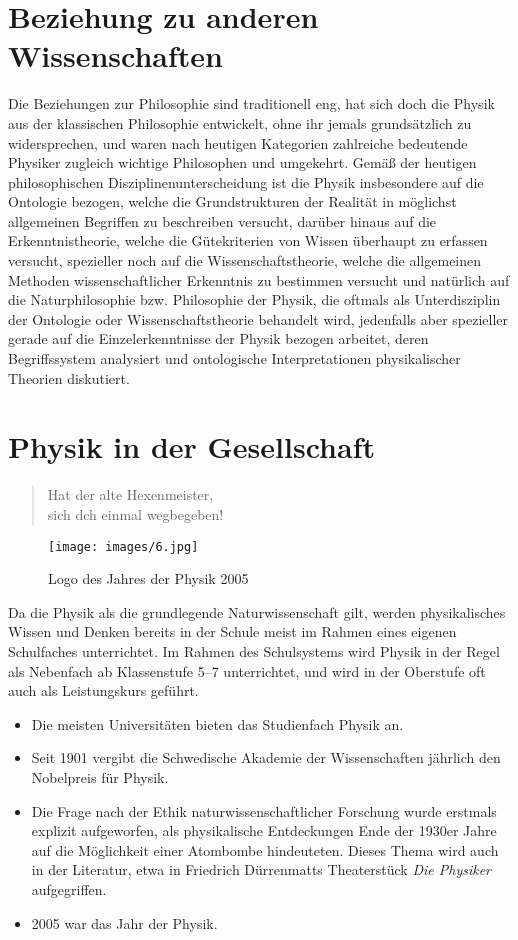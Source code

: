 \documentclass[titlepage, parkskip=full, twocolumn, landscape]{scrartcl}
\begin{document}
\section{Beziehung zu anderen Wissenschaften}

Die Beziehungen zur Philosophie sind traditionell eng, hat sich doch die Physik aus der klassischen Philosophie entwickelt, ohne ihr jemals grundsätzlich zu widersprechen, und waren nach heutigen Kategorien zahlreiche bedeutende Physiker zugleich wichtige Philosophen und umgekehrt. Gemäß der heutigen philosophischen Disziplinenunterscheidung ist die Physik insbesondere auf die Ontologie bezogen, welche die Grundstrukturen der Realität in möglichst allgemeinen Begriffen zu beschreiben versucht, darüber hinaus auf die Erkenntnistheorie, welche die Gütekriterien von Wissen überhaupt zu erfassen versucht, spezieller noch auf die Wissenschaftstheorie, welche die allgemeinen Methoden wissenschaftlicher Erkenntnis zu bestimmen versucht und natürlich auf die Naturphilosophie bzw. Philosophie der Physik, die oftmals als Unterdisziplin der Ontologie oder Wissenschaftstheorie behandelt wird, jedenfalls aber spezieller gerade auf die Einzelerkenntnisse der Physik bezogen arbeitet, deren Begriffssystem analysiert und ontologische Interpretationen physikalischer Theorien diskutiert.

\section{Physik in der Gesellschaft}
\begin{verse}
	Hat der alte Hexenmeister, \\ sich dch einmal wegbegeben!\\
\end{verse}
\begin{figure}
	\centering
	\texttt{[image: images/6.jpg]}
	\caption{Logo des Jahres der Physik 2005}
\end{figure}

Da die Physik als die grundlegende Naturwissenschaft gilt, werden physikalisches Wissen und Denken bereits in der Schule meist im Rahmen eines eigenen Schulfaches unterrichtet. Im Rahmen des Schulsystems wird Physik in der Regel als Nebenfach ab Klassenstufe 5--7 unterrichtet, und wird in der Oberstufe oft auch als Leistungskurs geführt.
\begin{itemize}
	\item Die meisten Universitäten bieten das Studienfach Physik an.
	\item Seit 1901 vergibt die Schwedische Akademie der Wissenschaften jährlich den Nobelpreis für Physik.
	\item Die Frage nach der Ethik naturwissenschaftlicher Forschung wurde erstmals explizit aufgeworfen, als physikalische Entdeckungen Ende der 1930er Jahre auf die Möglichkeit einer Atombombe hindeuteten. Dieses Thema wird auch in der Literatur, etwa in Friedrich Dürrenmatts Theaterstück \emph{Die Physiker} aufgegriffen.
	\item 2005 war das Jahr der Physik.
\end{itemize}
\end{document}
